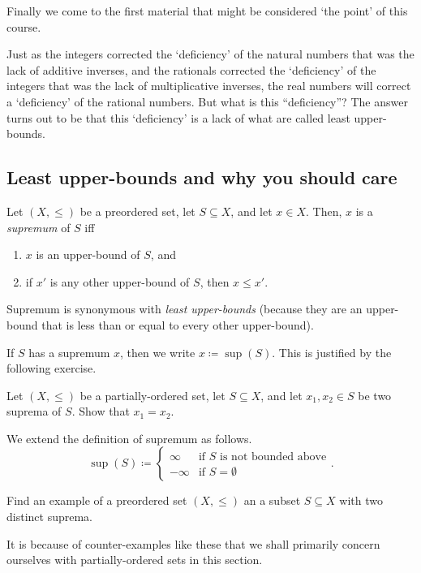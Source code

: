 Finally we come to the first material that might be considered `the point' of this course.

Just as the integers corrected the `deficiency' of the natural numbers that was the lack of additive inverses, and the rationals corrected the `deficiency' of the integers that was the lack of multiplicative inverses, the real numbers will correct a `deficiency' of the rational numbers.  But what is this ``deficiency''?  The answer turns out to be that this `deficiency' is a lack of what are called least upper-bounds.

\subsection{Least upper-bounds and why you should care}

\begin{dfn}[Suprema]
Let $(X,\leq )$ be a preordered set, let $S\subseteq X$, and let $x\in X$.  Then, $x$ is a \emph{supremum} of $S$ iff
\begin{enumerate}
\item $x$ is an upper-bound of $S$, and
\item if $x'$ is any other upper-bound of $S$, then $x\leq x'$.
\end{enumerate}
\begin{rmk}
Supremum is synonymous with \emph{least upper-bounds} (because they are an upper-bound that is less than or equal to every other upper-bound).
\end{rmk}
\begin{rmk}
If $S$ has a supremum $x$, then we write $x\coloneqq \sup (S)$.  This is justified by the following exercise.
\end{rmk}
\begin{exr}\label{exr1.4.4}
Let $(X,\leq )$ be a partially-ordered set, let $S\subseteq X$, and let $x_1,x_2\in S$ be two suprema of $S$.  Show that $x_1=x_2$.
\end{exr}
We extend the definition of supremum as follows.
\begin{equation}
\sup (S)\coloneqq \begin{cases}\infty & \text{if }S\text{ is not bounded above} \\ -\infty & \text{if }S=\emptyset \end{cases}.
\end{equation}
\end{dfn}
\begin{exr}
Find an example of a preordered set $(X,\leq )$ an a subset $S\subseteq X$ with two distinct suprema.
\begin{rmk}
It is because of counter-examples like these that we shall primarily concern ourselves with partially-ordered sets in this section.
\end{rmk}
\end{exr}
